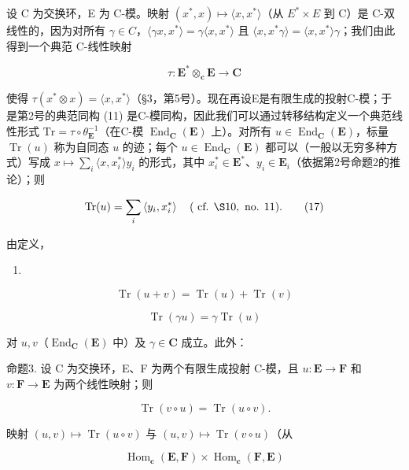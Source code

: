 设 C 为交换环，E 为 C-模。映射 \((x^{*}, x) \mapsto \langle x, x^{*} \rangle\)（从 \(E^{*} \times E\) 到 C）是 C-双线性的，因为对所有 \(\gamma \in C\)，\(\langle \gamma x, x^{*} \rangle = \gamma \langle x, x^{*} \rangle\) 且 \(\langle x, x^{*} \gamma \rangle = \langle x, x^{*} \rangle \gamma\)；我们由此得到一个典范 C-线性映射

\[
\tau : \mathbf {E} ^ {*} \otimes_ {\mathbf {c}} \mathbf {E} \rightarrow \mathbf {C}\tag{16}
\]

使得 \(\tau(x^{*} \otimes x) = \langle x, x^{*} \rangle\)（§3，第5号）。现在再设E是有限生成的投射C-模；于是第2号的典范同构 (11) 是C-模同构，因此我们可以通过转移结构定义一个典范线性形式 \(\mathrm{Tr} = \tau \circ \theta_{\mathbf{E}}^{-1}\)（在C-模 \(\operatorname{End}_{\mathbf{C}}(\mathbf{E})\) 上）。对所有 \(u \in \operatorname{End}_{\mathbf{C}}(\mathbf{E})\)，标量 \(\operatorname{Tr}(u)\) 称为自同态 \(u\) 的迹；每个 \(u \in \operatorname{End}_{\mathbf{C}}(\mathbf{E})\) 都可以（一般以无穷多种方式）写成 \(x \mapsto \sum_{i} \langle x, x_{i}^{*} \rangle y_{i}\) 的形式，其中 \(x_{i}^{*} \in \mathbf{E}^{*}\)、\(y_{i} \in \mathbf{E}_{i}\)（依据第2号命题2的推论）；则

\[
\operatorname{Tr} (u) = \sum_ {i} \left\langle y _ {i}, x _ {i} ^ {*} \right\rangle \quad (\text { cf. } \S 1 0, \text { no. } 1 1).\tag{17}
\]

由定义，

\begin{enumerate}
\def\labelenumi{(\arabic{enumi})}
\setcounter{enumi}{17}
\tightlist
\item
\end{enumerate}

\[
\operatorname{Tr} (u + v) = \operatorname{Tr} (u) + \operatorname{Tr} (v)\tag{19}
\]

\[
\operatorname{Tr} (\gamma u) = \gamma \operatorname{Tr} (u)
\]

对 \(u, v\)（\(\operatorname{End}_{\mathbf{C}}(\mathbf{E})\) 中）及 \(\gamma \in \mathbf{C}\) 成立。此外：

命题3. 设 C 为交换环，E、F 为两个有限生成投射 C-模，且 \(u: \mathbf{E} \to \mathbf{F}\) 和 \(v: \mathbf{F} \to \mathbf{E}\) 为两个线性映射；则

\[
\operatorname{Tr} (v \circ u) = \operatorname{Tr} (u \circ v).\tag{20}
\]

映射 \((u, v) \mapsto \operatorname{Tr}(u \circ v)\) 与 \((u, v) \mapsto \operatorname{Tr}(v \circ u)\)（从

\[
\operatorname{Hom} _ {\mathbf {c}} (\mathbf {E}, \mathbf {F}) \times \operatorname{Hom} _ {\mathbf {c}} (\mathbf {F}, \mathbf {E})
\]

